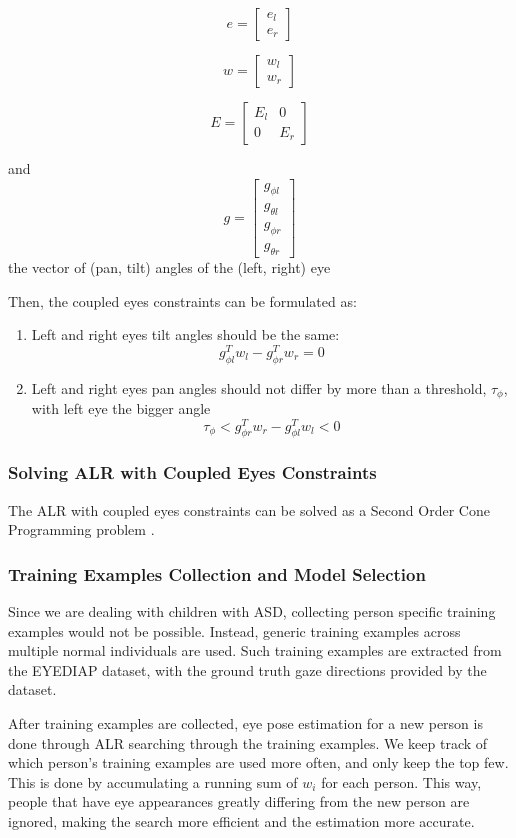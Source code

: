 \[  e = \begin{bmatrix}
e_l \\ e_r
\end{bmatrix}   \]

\[  w = \begin{bmatrix}
w_l \\ w_r
\end{bmatrix}   \]

\[  E = \begin{bmatrix}
E_l	&	0 \\
0	&	E_r
\end{bmatrix}  \]

and \[g = \begin{bmatrix}
g_{\phi l} \\ g_{\theta l} \\ g_{\phi r} \\ g_{\theta r}
\end{bmatrix}  \]
the vector of (pan, tilt) angles of the (left, right) eye

Then, the coupled eyes constraints can be formulated as: 
\begin{enumerate}
	\item Left and right eyes tilt angles should be the same:
	\[ g_{\phi l}^T w_l -  g_{\phi r}^T w_r = 0 \]
	
	\item Left and right eyes pan angles should not differ by more than a threshold, \(\tau_\phi\), with left eye the bigger angle
	\[  \tau_\phi < g_{\phi r}^T w_r - g_{\phi l}^T w_l < 0 \]
\end{enumerate}


\subsubsection{Solving ALR with Coupled Eyes Constraints}
The ALR with coupled eyes constraints can be solved as a Second Order Cone Programming problem \cite{funes2013person, kim2001second}.


\subsubsection{Training Examples Collection and Model Selection}
Since we are dealing with children with ASD, collecting person specific training examples would not be possible.  Instead, generic training examples across multiple normal individuals are used.  Such training examples are extracted from the EYEDIAP dataset, with the ground truth gaze directions provided by the dataset.

After training examples are collected, eye pose estimation for a new person is done through ALR searching through the training examples.  We keep track of which person's training examples are used more often, and only keep the top few.  This is done by accumulating a running sum of \(w_i\) for each person.  This way, people that have eye appearances greatly differing from the new person are ignored, making the search more efficient and the estimation more accurate.